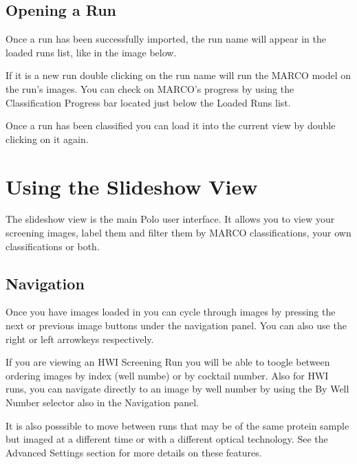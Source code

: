 \documentclass[letterpaper,10pt,english]{sphinxmanual}
\begin{document}
\subsection{Opening a Run}
\label{\detokenize{user_guide:opening-a-run}}
Once a run has been successfully imported, the run name will appear in the
loaded runs list, like in the image below.

If it is a new run double clicking on the run name will run the MARCO model
on the run’s images. You can check on MARCO’s progress by using the
Classification Progress bar located just below the Loaded Runs list.

Once a run has been classified you can load it into the current view
by double clicking on it again.


\section{Using the Slideshow View}
\label{\detokenize{user_guide:using-the-slideshow-view}}
The slideshow view is the main Polo user interface. It allows you to view
your screening images, label them and filter them by MARCO classifications,
your own classifications or both.


\subsection{Navigation}
\label{\detokenize{user_guide:navigation}}
Once you have images loaded in you can cycle through images by
pressing the next or previous image buttons under the navigation
panel. You can also use the right or left arrowkeys respectively.

If you are viewing an HWI Screening Run you will be able to toogle
between ordering images by index (well numbe) or by cocktail number. Also
for HWI runs, you can navigate directly to an image by well number by using
the By Well Number selector also in the Navigation panel.

It is also posssible to move between runs that may be of the same protein
sample but imaged at a different time or with a different optical
technology. See the Advanced Settings section for more details on
these features.
\end{document}
